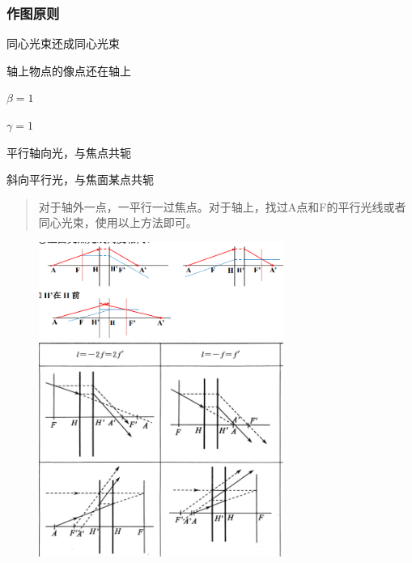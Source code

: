 \subsubsection{作图原则}
\begin{description}[leftmargin=1.7cm,style=nextline,nosep]%
    \item[同心光束] 同心光束还成同心光束
    \item[轴上] 轴上物点的像点还在轴上  
    \item[主面] $\beta=1$
    \item[节点]  $\gamma =1$
    \item[无穷远像物方轴上点] 平行轴向光，与焦点共轭
    \item[无穷远像物轴外电点] 斜向平行光，与焦面某点共轭   
\end{description}
\begin{quote}
{\qquad{}\ccwd\kaishu{}
对于轴外一点，一平行一过焦点。对于轴上，找过A点和F的平行光线或者同心光束，使用以上方法即可。
}
\end{quote}
        \begin{figure}[H]
            \centering
            \includegraphics[width=8cm]{img/3.4.png}
            
            \includegraphics[width=8cm]{img/3.11.png}
        \end{figure}
